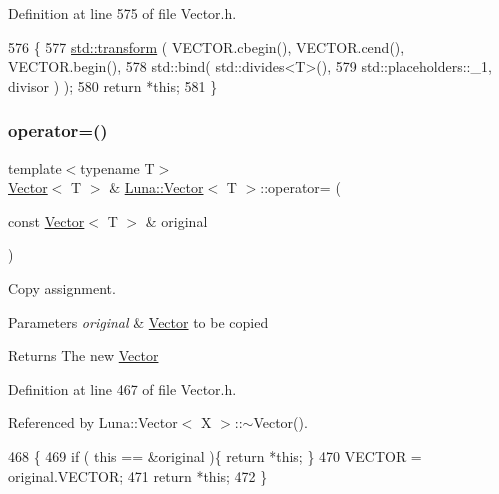 Definition at line 575 of file Vector.\+h.


\begin{DoxyCode}
576   \{
577     \hyperlink{namespaceHeat__plot_aeaa6785bedcad63b4bd40e8cb1bad8a0}{std::transform} ( VECTOR.cbegin(), VECTOR.cend(), VECTOR.begin(),
578                      std::bind( std::divides<T>(),
579                                 std::placeholders::\_1, divisor ) );
580     \textcolor{keywordflow}{return} *\textcolor{keyword}{this};
581   \}
\end{DoxyCode}
\mbox{\label{classLuna_1_1Vector_af2ee9028f1c40a21a2a4055e63b70b2c}} 
\subsubsection{\texorpdfstring{operator=()}{operator=()}}
{\footnotesize\ttfamily template$<$typename T$>$ \\
\hyperlink{classLuna_1_1Vector}{Vector}$<$ T $>$ \& \hyperlink{classLuna_1_1Vector}{Luna\+::\+Vector}$<$ T $>$\+::operator= (\begin{DoxyParamCaption}\item[{const \hyperlink{classLuna_1_1Vector}{Vector}$<$ T $>$ \&}]{original }\end{DoxyParamCaption})\hspace{0.3cm}{\ttfamily [inline]}}



Copy assignment. 


\begin{DoxyParams}{Parameters}
{\em original} & \hyperlink{classLuna_1_1Vector}{Vector} to be copied \\
\hline
\end{DoxyParams}
\begin{DoxyReturn}{Returns}
The new \hyperlink{classLuna_1_1Vector}{Vector} 
\end{DoxyReturn}


Definition at line 467 of file Vector.\+h.



Referenced by Luna\+::\+Vector$<$ X $>$\+::$\sim$\+Vector().


\begin{DoxyCode}
468   \{
469     \textcolor{keywordflow}{if} ( \textcolor{keyword}{this} == &original )\{ \textcolor{keywordflow}{return} *\textcolor{keyword}{this}; \}
470     VECTOR = original.VECTOR;
471     \textcolor{keywordflow}{return} *\textcolor{keyword}{this};
472   \}
\end{DoxyCode}
\mbox{\label{classLuna_1_1Vector_adb31a846162021be5bc13b33cdbabc1c}} 
